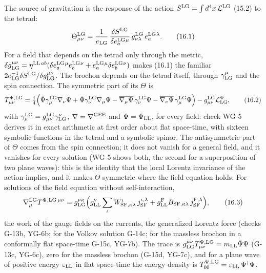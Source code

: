 \documentclass[
  10pt,
]{article}
\begin{document}
The source of gravitation is the response of the action
\(S^{\rm LG}=\int d^4x\,\mathcal L^{\rm LG}\) (15.2) to the tetrad:
\[\Theta^{\rm LG}_{\mu\nu}=\frac1{e_{\rm LG}}\,\frac{\delta S^{\rm LG}}{\delta e^{\rm LG}_a{}^\mu}\,g^{\rm LG}_{\nu\lambda}\,e^{\rm LG}_a{}^\lambda.\tag{16.1}\]
For a field that depends on the tetrad only through the metric,
\(\delta g_{\rm LG}^{\mu\nu}=\eta^{{\rm LL}\,ab}(\delta e^{\rm LG}_a{}^\mu e^{\rm LG}_b{}^\nu+e^{\rm LG}_a{}^\mu\delta e^{\rm LG}_b{}^\nu)\)
makes (16.1) the familiar
\(2e_{\rm LG}^{-1}\delta S^{\rm LG}/\delta g_{\rm LG}^{\mu\nu}\). The
brochon depends on the tetrad itself, through \(\gamma^\mu_{\rm LG}\)
and the spin connection. The symmetric part of its \(\Theta\) is
\[T^{\Psi,{\rm LG}}_{\mu\nu}=\tfrac i4\Big(\bar\Psi\gamma^{\rm LG}_\mu\nabla_\nu\Psi+\bar\Psi\gamma^{\rm LG}_\nu\nabla_\mu\Psi-\overline{\nabla_\mu\Psi}\,\gamma^{\rm LG}_\nu\Psi-\overline{\nabla_\nu\Psi}\,\gamma^{\rm LG}_\mu\Psi\Big)-g^{\rm LG}_{\mu\nu}\mathcal L^\Psi_{\rm LG},\tag{16.2}\]
with \(\gamma^{\rm LG}_\mu=g^{\rm LG}_{\mu\nu}\gamma^\nu_{\rm LG}\),
\(\nabla=\nabla^{\rm GEE}\) and \(\Psi=\Psi_{\rm LL}\), for every field:
check WG-5 derives it in exact arithmetic at first order about flat
space-time, with sixteen symbolic functions in the tetrad and a symbolic
spinor. The antisymmetric part of \(\Theta\) comes from the spin
connection; it does not vanish for a general field, and it vanishes for
every solution (WG-5 shows both, the second for a superposition of two
plane waves): this is the identity that the local Lorentz invariance of
the action implies, and it makes \(\Theta\) symmetric where the field
equation holds. For solutions of the field equation without
self-interaction,
\[\nabla^{\rm LG}_\mu T^{\Psi,{\rm LG}\,\mu\nu}=g_{\rm LG}^{\nu\kappa}\Big(g^{\rm v}_{\rm LL}\sum_\iota W^\iota_{{\rm SF},\kappa\lambda}\,j^{\iota,\lambda}_{\rm SF}+g^{\rm F}_{\rm LL}B_{{\rm SF},\kappa\lambda}\,j^{{\rm F},\lambda}_{\rm SF}\Big),\tag{16.3}\]
the work of the gauge fields on the currents, the generalized Lorentz
force (checks G-13b, YG-6b; for the Volkov solution G-14c; for the
massless brochon in a conformally flat space-time G-15c, YG-7b). The
trace is
\(g_{\rm LG}^{\mu\nu}T^{\Psi,{\rm LG}}_{\mu\nu}=m_{\rm LL}\bar\Psi\Psi\)
(G-13c, YG-6c), zero for the massless brochon (G-15d, YG-7c), and for a
plane wave of positive energy \(\varepsilon_{\rm LL}\) in flat
space-time the energy density is
\(T^{\Psi,{\rm LG}}_{00}=\varepsilon_{\rm LL}\,\Psi^\dagger\Psi\).
\end{document}

